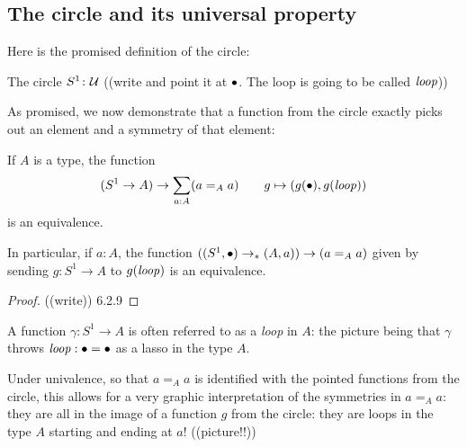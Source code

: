 \subsection{The circle and its universal property}
\label{sec:S1}

Here is the promised definition of the circle:
\begin{definition}
  \label{def:circle}
The circle $S^1\colon\mathcal{U}$ ((write and point it at $\bullet$.  The loop is going to be called $\mathit{loop}$))
\end{definition}
As promised, we now demonstrate that a function from the circle exactly picks out an element and a symmetry of that element:
\begin{lemma}\label{lem:freeloopspace}
  If $A$ is a type, the function $$(S^1\to A)\to \sum_{a:A}(a=_Aa)\qquad g\mapsto (g(\bullet),g(\mathit{loop}))$$
is an equivalence.  

In particular, if $a:A$, the function $((S^1,\bullet)\to_* (A,a))\to (a=_Aa)$ given by sending $g:S^1\to A$ to $g(\mathit{loop})$ is an equivalence. 
\end{lemma}
\begin{proof}
  ((write)) 6.2.9
\end{proof}
\begin{remark}
  A function $\gamma:S^1\to A$ is often referred to as a \emph{loop} in $A$: the picture being that $\gamma$ throws $\mathit{loop}:\bullet=\bullet$ as a lasso in the type $A$.

  Under univalence, so that $a=_Aa$ is identified with the pointed functions from the circle, this allows for a very graphic interpretation of the symmetries in $a=_Aa$: they are all in the image of a function $g$ from the circle: they are loops in the type $A$ starting and ending at $a$! ((picture!!))
\end{remark}


